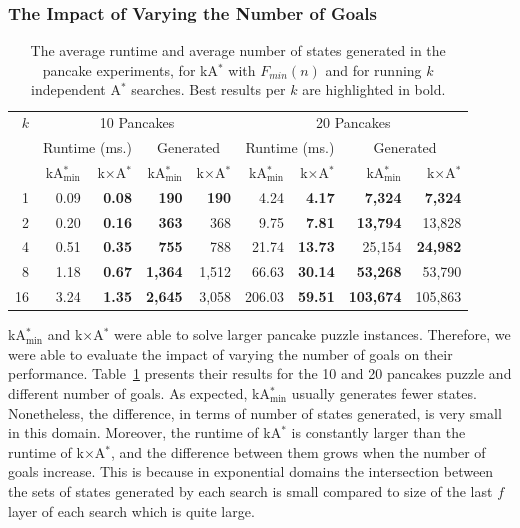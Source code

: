 \documentclass[twoside,11pt]{article}
\newcommand{\astar}{A$^*$\xspace}
\newcommand{\kastar}{kA$^*$\xspace}
\newcommand{\kastarvar}[1]{\textup{kA}$^*_{#1}$\xspace}
\newcommand{\kastarmin}{\kastarvar{\min}}
\newcommand{\kxastar}{k$\times$A$^*$\xspace}
\newcommand{\minf}{$F_{min}(n)$\xspace}
\begin{document}
\subsubsection{The Impact of Varying the Number of Goals}
\newcommand{\tbf}[1]{\textbf{#1}}
\begin{table}
  \centering
  \caption{The average runtime and average number of states generated in the pancake experiments, for \kastar with \minf and for running $k$ independent \astar searches.
  Best results per $k$ are highlighted in bold.}
  \label{tab:pancake-minf-k-searches}
  \begin{tabular}{rrrrrrrrr}
   \toprule
  $k$ & \multicolumn{4}{c}{10 Pancakes} & \multicolumn{4}{c}{20 Pancakes} \\
   \cmidrule(r){2-5}\cmidrule(l){6-9}
      & \multicolumn{2}{c}{Runtime (ms.)} & \multicolumn{2}{c}{Generated} & \multicolumn{2}{c}{Runtime (ms.)} & \multicolumn{2}{c}{Generated} \\
   \cmidrule(r){2-3}\cmidrule(lr){4-5} \cmidrule(lr){6-7}\cmidrule(l){8-9}
      & \kastarmin & \kxastar & \kastarmin & \kxastar & \kastarmin & \kxastar & \kastarmin & \kxastar \\
   \midrule
1  & 0.09 & \tbf{0.08} &   \tbf{190} & \tbf{190} &  4.24 & \tbf{4.17} & \tbf{7,324} & \tbf{7,324} \\
2  & 0.20 & \tbf{0.16} &   \tbf{363} &     368  &   9.75 &  \tbf{7.81} & \tbf{13,794} &    13,828 \\
4  & 0.51 & \tbf{0.35} &   \tbf{755} &     788  &  21.74 & \tbf{13.73} &    25,154 & \tbf{24,982} \\
8  & 1.18 & \tbf{0.67} & \tbf{1,364} &   1,512  &  66.63 & \tbf{30.14} & \tbf{53,268} &    53,790 \\
16 & 3.24 & \tbf{1.35} & \tbf{2,645} &   3,058  & 206.03 & \tbf{59.51} & \tbf{103,674} &  105,863 \\
  \bottomrule
  \end{tabular}
\end{table}

\kastarmin and \kxastar were able to solve larger pancake puzzle instances.
Therefore, we were able to evaluate  the impact of varying the number of goals on their performance.
Table~\ref{tab:pancake-minf-k-searches} presents their results for the 10 and 20 pancakes puzzle and different number of goals.
As expected, \kastarmin usually generates fewer states.
Nonetheless, the difference, in terms of number of states generated, is very small in this domain.
Moreover, the runtime of \kastar is constantly larger than the runtime of \kxastar, and the difference between them grows when the number of goals increase.
This is because in exponential domains the intersection between the sets of states generated by each search is small compared to size of the last $f$ layer of each search which is quite large.
\end{document}
